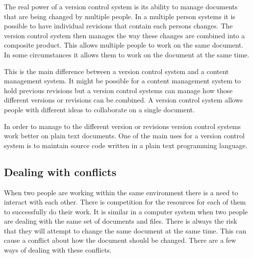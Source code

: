 % 
% 

The real power of a version control system is its ability to manage documents that are being changed by multiple people.  In a multiple person systems it is possible to have individual revisions that contain each persons changes. The version control system then manages the way these changes are combined into a composite product. This allows multiple people to work on the same document. In some circumstances it allows them to work on the document at the same time.

This is the main difference between a version control system and a content management system.  It might be possible for a content management system to hold previous revisions but a version control systems can manage how those different versions or revisions can be combined.  A version control system allows people with different ideas to collaborate on a single document.

In order to manage to the different version or revisions version control systems work better on plain text documents. One of the main uses for a version control system is to maintain source code written in a plain text programming language.



\subsection{Dealing with conflicts}
When two people are working within the same environment there is a need to interact with each other.
There is competition for the resources for each of them to successfully do their work.
It is similar in a computer system when two people are dealing with the same set of documents and files.
There is always the risk that they will attempt to change the same document at the same time.
This can cause a conflict about how the document should be changed.
There are a few ways of dealing with these conflicts.

